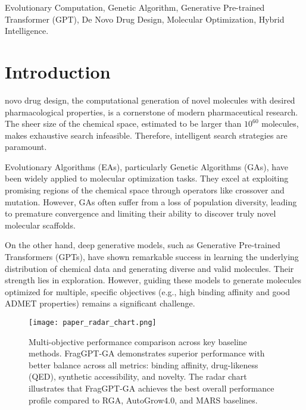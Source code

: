 \documentclass[lettersize,journal]{IEEEtran}
\begin{document}
\begin{IEEEkeywords}
Evolutionary Computation, Genetic Algorithm, Generative Pre-trained Transformer (GPT), De Novo Drug Design, Molecular Optimization, Hybrid Intelligence.
\end{IEEEkeywords}

\section{Introduction}
 novo drug design, the computational generation of novel molecules with desired pharmacological properties, is a cornerstone of modern pharmaceutical research. The sheer size of the chemical space, estimated to be larger than $10^{60}$ molecules, makes exhaustive search infeasible. Therefore, intelligent search strategies are paramount.

Evolutionary Algorithms (EAs), particularly Genetic Algorithms (GAs), have been widely applied to molecular optimization tasks. They excel at exploiting promising regions of the chemical space through operators like crossover and mutation. However, GAs often suffer from a loss of population diversity, leading to premature convergence and limiting their ability to discover truly novel molecular scaffolds.

On the other hand, deep generative models, such as Generative Pre-trained Transformers (GPTs), have shown remarkable success in learning the underlying distribution of chemical data and generating diverse and valid molecules. Their strength lies in exploration. However, guiding these models to generate molecules optimized for multiple, specific objectives (e.g., high binding affinity and good ADMET properties) remains a significant challenge.

\begin{figure}[!t]
\centering
\texttt{[image: paper\_radar\_chart.png]}
\caption{Multi-objective performance comparison across key baseline methods. FragGPT-GA demonstrates superior performance with better balance across all metrics: binding affinity, drug-likeness (QED), synthetic accessibility, and novelty. The radar chart illustrates that FragGPT-GA achieves the best overall performance profile compared to RGA, AutoGrow4.0, and MARS baselines.}
\label{fig:radar_comparison}
\end{figure}
\end{document}
